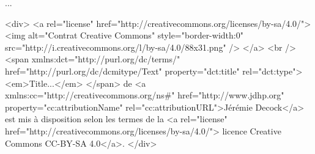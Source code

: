 \documentclass{article}
\begin{document}
...

\begin{rawhtml}
    <div>
        <a rel="license" href="http://creativecommons.org/licenses/by-sa/4.0/">
            <img alt="Contrat Creative Commons" style="border-width:0" src="http://i.creativecommons.org/l/by-sa/4.0/88x31.png" />
        </a>
        <br />
        <span xmlns:dct="http://purl.org/dc/terms/" href="http://purl.org/dc/dcmitype/Text" property="dct:title" rel="dct:type">
            <em>Title...</em>
        </span>
        de
        <a xmlns:cc="http://creativecommons.org/ns#" href="http://www.jdhp.org" property="cc:attributionName" rel="cc:attributionURL">Jérémie Decock</a>
        est mis à disposition selon les termes de la
        <a rel="license" href="http://creativecommons.org/licenses/by-sa/4.0/"> licence Creative Commons CC-BY-SA 4.0</a>.
    </div>
\end{rawhtml}



\end{document}
